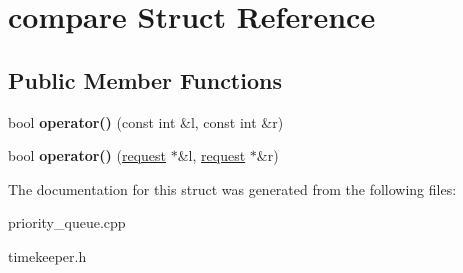 \hypertarget{structcompare}{\section{compare \-Struct \-Reference}
\label{structcompare}
}
\subsection*{\-Public \-Member \-Functions}
\begin{DoxyCompactItemize}
\item 
\hypertarget{structcompare_a97bc7e8306d08ddca6176e7728bcb028}{bool {\bfseries operator()} (const int \&l, const int \&r)}\label{structcompare_a97bc7e8306d08ddca6176e7728bcb028}

\item 
\hypertarget{structcompare_ad08955a287fca835490d9b31d9b29299}{bool {\bfseries operator()} (\hyperlink{structrequest}{request} $\ast$\&l, \hyperlink{structrequest}{request} $\ast$\&r)}\label{structcompare_ad08955a287fca835490d9b31d9b29299}

\end{DoxyCompactItemize}


\-The documentation for this struct was generated from the following files\-:\begin{DoxyCompactItemize}
\item 
priority\-\_\-queue.\-cpp\item 
timekeeper.\-h\end{DoxyCompactItemize}
